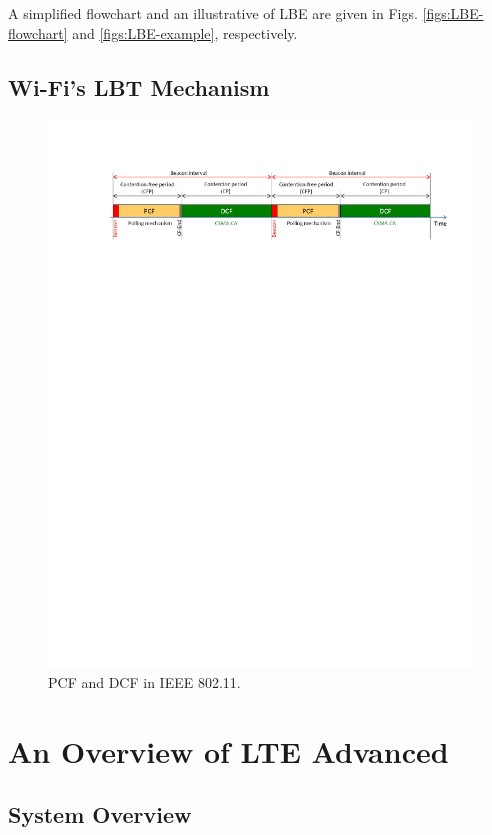 \documentclass[12pt,onecolumn]{article}
\begin{document}
A simplified flowchart and an illustrative of LBE are given in Figs. \ref{figs:LBE-flowchart} and \ref{figs:LBE-example}, respectively.

\subsection{Wi-Fi's LBT Mechanism}

\begin{figure}[!t]
\centering
\includegraphics[width=1.0\columnwidth]{figures2/802-11-PCF-DCF}
\caption{PCF and DCF in IEEE 802.11.}
\label{figs:802-11-PCF-DCF}
\end{figure}


\section{An Overview of LTE Advanced}
\subsection{System Overview}
\end{document}
